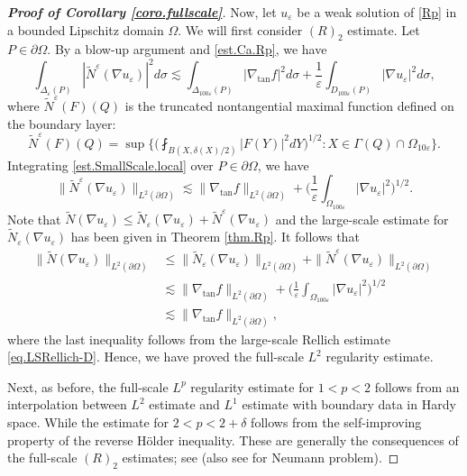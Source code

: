 \documentclass[reqno,12pt]{amsart} %
\theoremstyle{definition}
\theoremstyle{remark}
\numberwithin{equation}{section}
\newcommand{\e}{\varepsilon}
\begin{document}
\begin{proof}[\textbf{Proof of Corollary \ref{coro.fullscale}}]
    Now, let $u_\e$ be a weak solution of \eqref{Rp} in a bounded Lipschitz domain $\Omega$. We will first consider $(R)_2$ estimate. Let $P\in \partial \Omega$. By a blow-up argument and \eqref{est.Ca.Rp}, we have
    \begin{equation}\label{est.SmallScale.local}
        \int_{\Delta_\e(P)} |\widetilde{N}^\e(\nabla u_\e)|^2 d\sigma \lesssim \int_{\Delta_{100\e}(P)} |\nabla_{\tan} f|^2 d\sigma + \frac{1}{\e}\int_{D_{100\e}(P)} |\nabla u_\e|^2 d\sigma,
    \end{equation}
    where $\widetilde{N}^\e(F)(Q)$ is the truncated nontangential maximal function defined on the boundary layer:
    \begin{equation}
    \widetilde{N}^\e(F)(Q) = \sup \bigg\{ \bigg(\fint_{B(X, \delta(X)/2) }|F(Y)|^2 dY \bigg)^{1/2}: X\in \Gamma(Q) \cap \Omega_{10\e} \bigg\}.
    \end{equation}
    Integrating \eqref{est.SmallScale.local} over $P\in \partial \Omega$, we have
    \begin{equation}
        \| \widetilde{N}^\e(\nabla u_\e) \|_{L^2(\partial \Omega)} \lesssim \| \nabla_{\tan} f \|_{L^2(\partial \Omega)} + \bigg( \frac{1}{\e} \int_{\Omega_{100\e}} |\nabla u_\e|^2 \bigg)^{1/2}.
    \end{equation}
    Note that $\widetilde{N}(\nabla u_\e) \le \widetilde{N}_\e(\nabla u_\e) + \widetilde{N}^\e(\nabla u_\e)$ and the large-scale estimate for $\widetilde{N}_\e(\nabla u_\e)$ has been given in Theorem \ref{thm.Rp}. It follows that
    \begin{equation}\label{est.S+L}
    \begin{aligned}
        \| \widetilde{N}(\nabla u_\e) \|_{L^2(\partial \Omega)} & \le \| \widetilde{N}_\e(\nabla u_\e) \|_{L^2(\partial \Omega)} + \| \widetilde{N}^\e(\nabla u_\e) \|_{L^2(\partial \Omega)} \\
        & \lesssim \| \nabla_{\tan} f \|_{L^2(\partial \Omega)} + \bigg( \frac{1}{\e} \int_{\Omega_{100\e}} |\nabla u_\e|^2 \bigg)^{1/2} \\
        & \lesssim \| \nabla_{\tan} f \|_{L^2(\partial \Omega)},
        \end{aligned}
    \end{equation}
    where the last inequality follows from the large-scale Rellich estimate \eqref{eq.LSRellich-D}. Hence, we have proved the full-scale $L^2$ regularity estimate.

    Next, as before, the full-scale $L^p$ regularity estimate for $1<p<2$ follows from an interpolation between $L^2$ estimate and $L^1$ estimate with boundary data in Hardy space. While the estimate for $2<p<2+\delta$ follows from the self-improving property of the reverse H\"{o}lder inequality. These are generally the consequences of the full-scale $(R)_2$ estimates; see \cite[Theorem 5.2, 5.3]{KP93} (also see \cite[Theorem 6.2, 6.3]{KP93} for Neumann problem).


\end{proof}
\end{document}
